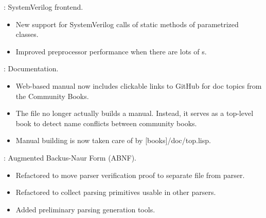 
\begin{frame}

\implibtitle

:
SystemVerilog frontend.
\begin{itemize}
\item New support for SystemVerilog calls of
      static methods of parametrized classes.
\item Improved preprocessor performance when there are lots of s.
\end{itemize}

\end{frame}


\begin{frame}

\implibtitle

:
Documentation.
\begin{itemize}
\item Web-based manual now includes clickable links to GitHub for doc topics
      from the Community Books.
\item The file  no longer actually builds a
      manual.  Instead, it serves as a top-level book to detect name conflicts
      between community books.
\item Manual building is now taken care of by [books]/doc/top.lisp.
\end{itemize}

\end{frame}


\begin{frame}

\implibtitle

:
Augmented Backus-Naur Form (ABNF).
\begin{itemize}
\item Refactored to move parser verification proof to separate file from parser.
\item Refactored to collect parsing primitives usable in other parsers.
\item Added preliminary parsing generation tools.
\end{itemize}

\end{frame}

